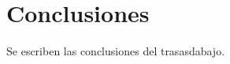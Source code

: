 \rhead{\newtitle}
\cfoot{\thepage}
\renewcommand{\headrulewidth}{1pt}
\renewcommand{\footrulewidth}{1pt}
\chapter{Conclusiones}
\noindent Se escriben las conclusiones del trasasdabajo.